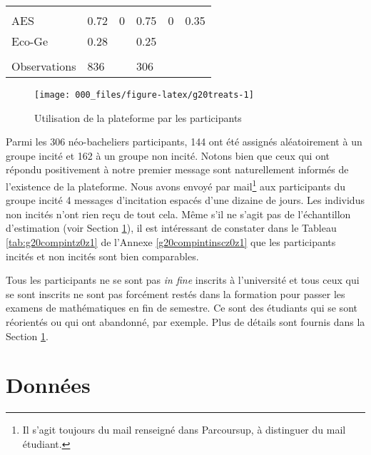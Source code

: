 \documentclass[
]{book}
\begin{document}
\begin{ThreePartTable}
\begin{longtable}[t]{llllll}
\addlinespace[0.3em]
\multicolumn{6}{l}{\textbf{Filière}}\\
\hspace{1em}AES & 0.72 & 0 & 0.75 & 0 & 0.35\\
\hspace{1em}Eco-Ge & 0.28 &  & 0.25 &  & \\
\addlinespace[0.3em]
\multicolumn{6}{l}{\textbf{ }}\\
\hspace{1em}Observations & 836 &  & 306 &  & \\*
\end{longtable}
\end{ThreePartTable}
\endgroup{}
\newpage

\begin{figure}[H]

{\centering \texttt{[image: 000\_files/figure-latex/g20treats-1]} 

}

\caption{Utilisation de la plateforme par les participants}\label{fig:g20treats}
\end{figure}

Parmi les 306 néo-bacheliers participants, 144 ont été assignés aléatoirement à un groupe incité et 162 à un groupe non incité. Notons bien que ceux qui ont répondu positivement à notre premier message sont naturellement informés de l'existence de la plateforme.
Nous avons envoyé par mail\footnote{Il s'agit toujours du mail renseigné dans Parcoursup, à distinguer du mail étudiant.} aux participants du groupe incité 4 messages d'incitation espacés d'une dizaine de jours. Les individus non incités n'ont rien reçu de tout cela. Même s'il ne s'agit pas de l'échantillon d'estimation (voir Section \ref{g20data}), il est intéressant de constater dans le Tableau \ref{tab:g20compintz0z1} de l'Annexe \ref{g20compintinscz0z1} que les participants incités et non incités sont bien comparables.

\quad Tous les participants ne se sont pas \emph{in fine} inscrits à l'université et tous ceux qui se sont inscrits ne sont pas forcément restés dans la formation pour passer les examens de mathématiques en fin de semestre. Ce sont des étudiants qui se sont réorientés ou qui ont abandonné, par exemple. Plus de détails sont fournis dans la Section \ref{g20data}.

\hypertarget{g20data}{%
\section{Données}\label{g20data}}
\end{document}
